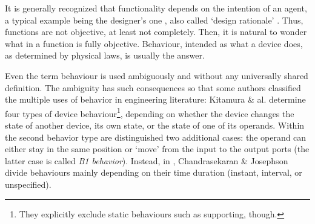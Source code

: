 \documentclass[sw]{iosart2x}
\newcommand{\firstTimeKeyWord}[1]{\textit{#1}}
\newcommand{\quotes}[1]{`#1'}
\newcommand{\TODO}[1]{{\color{red} #1}}
\begin{document}
It is generally recognized that functionality depends on the intention of an agent, a typical example being the designer's one \cite{kitamuraOntologyBasedFunctionalKnowledgeModeling2004}, also called \quotes{design rationale} \cite{chandrasekaranFunctionalRepresentationDesign1993}. 
Thus, functions are not objective, at least not completely. 
Then, it is natural to wonder what in a function is fully objective. Behaviour, intended as what a device does, as determined by physical laws, is usually the answer.    


Even the term behaviour is used ambiguously and without any universally shared definition. 
The ambiguity has such consequences so that some authors classified the multiple uses of behavior in engineering literature: 
Kitamura \& al. \cite{kitamuraOntologyBasedFunctionalKnowledgeModeling2004} determine four types of device behaviour\footnote{They explicitly exclude static behaviours such as supporting, though.}, depending on whether the device changes the state of another device, its own state, or the state of one of its operands. Within the second behavior type are distinguished two additional cases: the operand can either stay in the same position or `move' from the input to the output ports (the latter case is called \firstTimeKeyWord{B1 behavior}).
Instead, in \cite{chandrasekaranFunctionDeviceRepresentation2000}, Chandrasekaran \& Josephson divide behaviours mainly depending on their time duration (instant, interval, or unspecified).

\end{document}
